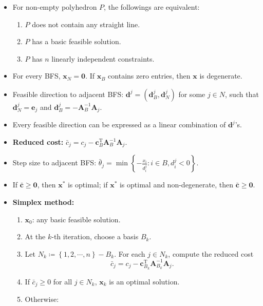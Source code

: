 \documentclass[10pt]{article}
\begin{document}
\begin{multicols*}{3}
\begin{itemize}
            \item For non-empty polyhedron $P$, the followings are equivalent:
            \begin{enumerate}
                \item $P$ does not contain any straight line.
                \item $P$ has a basic feasible solution.
                \item $P$ has $n$ linearly independent constraints.
            \end{enumerate}
            \item For every BFS, $\bm{x}_N = \mathbf{0}$. If $\bm{x}_B$ contains zero entries, then $\bm{x}$ is degenerate.
            \item Feasible direction to adjacent BFS: $\bm{d}^j = \left(\bm{d}^j_B, \bm{d}^j_N\right)$ for some $j \in N$, such that $\bm{d}^j_N = \bm{e}_j$ and $\bm{d}^j_B = -\bm{A}_B^{-1}\bm{A}_j$.
            \item Every feasible direction can be expressed as a linear combination of $\bm{d}^j$'s.
            \item \textbf{Reduced cost:} $\bar{c}_j = c_j - \bm{c}_B^{\mathrm{T}}\bm{A}_B^{-1}\bm{A}_j$.
            \item Step size to adjacent BFS: $\bar{\theta}_j = \min\left\{-\frac{x_i}{d^j_i} \colon i \in B, d^j_i < 0\right\}$.
            \item If $\bm{\bar{c}} \geq \mathbf{0}$, then $\bm{x}^*$ is optimal; if $\bm{x}^*$ is optimal and non-degenerate, then $\bm{\bar{c}} \geq \mathbf{0}$.
            \item \textbf{Simplex method:}
            \begin{enumerate}
                \item $\bm{x}_0$: any basic feasible solution. 
                \item At the $k$-th iteration, choose a basis $B_k$.
                \item Let $N_k \coloneqq \left\{1, 2, \cdots, n\right\} - B_k$. For each $j \in N_k$, compute the reduced cost 
                \begin{equation*}
                    \bar{c}_j = c_j - \bm{c}_{B_k}^{\mathrm{T}}\bm{A}_{B_k}^{-1}\bm{A}_j.
                \end{equation*}
                \item If $\bar{c}_j \geq 0$ for all $j \in N_k$, $\bm{x}_k$ is an optimal solution.
                \item Otherwise:

\end{enumerate}
\end{itemize}
\end{multicols*}
\end{document}
